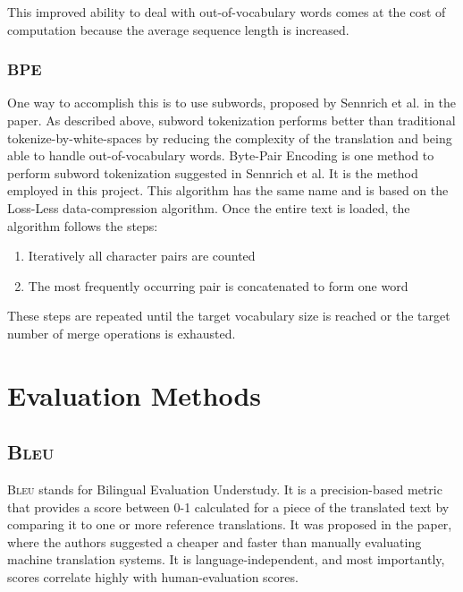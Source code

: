 \documentclass[12pt,a4paper,twoside,openright]{report}
\newcommand{\bleu}{\textsc{Bleu} }
\begin{document}
This improved ability to deal with out-of-vocabulary words comes at the cost of computation because the average sequence length is increased.

\subsubsection{BPE}
One way to accomplish this is to use subwords, proposed by Sennrich et al. in the paper\cite{subword-nmt}.
As described above, subword tokenization performs better than traditional tokenize-by-white-spaces by reducing the complexity of the translation and being able to handle out-of-vocabulary words. Byte-Pair Encoding is one method to perform subword tokenization suggested in Sennrich et al. It is the method employed in this project. This algorithm has the same name and is based on the Loss-Less data-compression algorithm. Once the entire text is loaded, the algorithm follows the steps:
\begin{enumerate}
    \item Iteratively all character pairs are counted
    \item The most frequently occurring pair is concatenated to form one word
\end{enumerate}
These steps are repeated until the target vocabulary size is reached or the target number of merge operations is exhausted.

\section{Evaluation Methods}
\label{evaluation-methods}

\subsection{\bleu}
\label{bleu}

\bleu stands for Bilingual Evaluation Understudy. It is a precision-based metric that provides a score between 0-1 calculated for a piece of the translated text by comparing it to one or more reference translations. It was proposed in the paper\cite{bleu}, where the authors suggested a cheaper and faster than manually evaluating machine translation systems. It is language-independent, and most importantly, scores correlate highly with human-evaluation scores.
\end{document}
